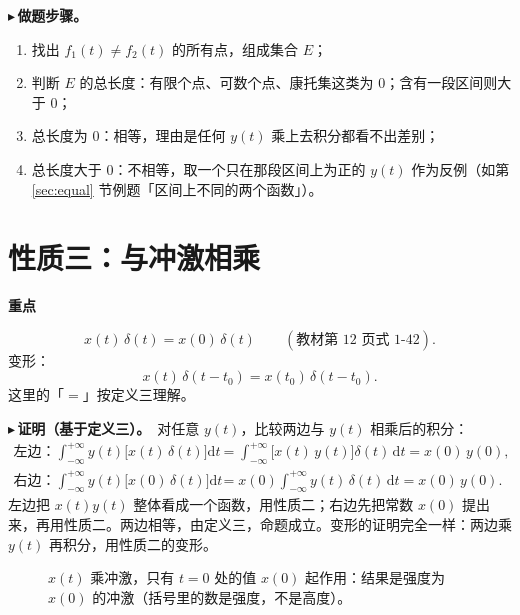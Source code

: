 \documentclass[UTF8,a4paper,11pt]{ctexart}
\newenvironment{remember}{\begin{rememberbox}\textbf{重点}\par\smallskip}{\end{rememberbox}}
\newcommand{\taxes}[4][t]{%
  \draw[->] (#2,0) -- (#3,0) node[right,font=\scriptsize] {$#1$};
  \draw[->] (0,-0.3) -- (0,#4);
  \node[anchor=north east,font=\tiny,gray!60!black,inner sep=1pt] at (0,-0.02) {$0$};}
\newcommand{\xt}[2]{\draw (#1,0) -- (#1,-0.1) node[anchor=north,font=\tiny,gray!60!black,fill=white,inner sep=0.6pt] {$#2$};}
\newcommand{\yt}[2]{\draw (0,#1) -- (-0.1,#1) node[anchor=east,font=\tiny,gray!60!black,fill=white,inner sep=0.6pt] {$#2$};}
\newcommand{\imp}[3]{\draw[->,ultra thick,red!70!black] (#1,0) -- (#1,#2);
  \node[anchor=south,font=\tiny,red!70!black,inner sep=1pt] at (#1,#2) {#3};}
\newcounter{ex}[section]
\newcommand{\point}[1]{\par\addvspace{1ex}\noindent\textcolor{ptteal}{$\blacktriangleright$\,\textbf{#1}}\ }
\begin{document}
\point{做题步骤。}
\begin{enumerate}[nosep]
\item 找出 $f_1(t)\ne f_2(t)$ 的所有点，组成集合 $E$；
\item 判断 $E$ 的总长度：有限个点、可数个点、康托集这类为 $0$；含有一段区间则大于 $0$；
\item 总长度为 $0$：相等，理由是任何 $y(t)$ 乘上去积分都看不出差别；
\item 总长度大于 $0$：不相等，取一个只在那段区间上为正的 $y(t)$ 作为反例（如第 \ref{sec:equal} 节例题「区间上不同的两个函数」）。
\end{enumerate}

\section{性质三：与冲激相乘}\label{sec:p3}
\begin{remember}
\[
x(t)\,\delta(t)=x(0)\,\delta(t)\qquad(\text{教材第 12 页式 1-42}).
\]
变形：
\[
x(t)\,\delta(t-t_0)=x(t_0)\,\delta(t-t_0).
\]
这里的「$=$」按定义三理解。
\end{remember}

\point{证明（基于定义三）。}对任意 $y(t)$，比较两边与 $y(t)$ 相乘后的积分：
\begin{align*}
\text{左边：}\int_{-\infty}^{+\infty}y(t)\big[x(t)\,\delta(t)\big]\mathrm{d}t
&=\int_{-\infty}^{+\infty}\big[x(t)\,y(t)\big]\delta(t)\,\mathrm{d}t=x(0)\,y(0),\\
\text{右边：}\int_{-\infty}^{+\infty}y(t)\big[x(0)\,\delta(t)\big]\mathrm{d}t
&=x(0)\int_{-\infty}^{+\infty}y(t)\,\delta(t)\,\mathrm{d}t=x(0)\,y(0).
\end{align*}
左边把 $x(t)y(t)$ 整体看成一个函数，用性质二；右边先把常数 $x(0)$ 提出来，再用性质二。两边相等，由定义三，命题成立。变形的证明完全一样：两边乘 $y(t)$ 再积分，用性质二的变形。

\begin{figure}[H]
\centering
{}
\caption{$x(t)$ 乘冲激，只有 $t=0$ 处的值 $x(0)$ 起作用：结果是强度为 $x(0)$ 的冲激（括号里的数是强度，不是高度）。}
\end{figure}
\end{document}
